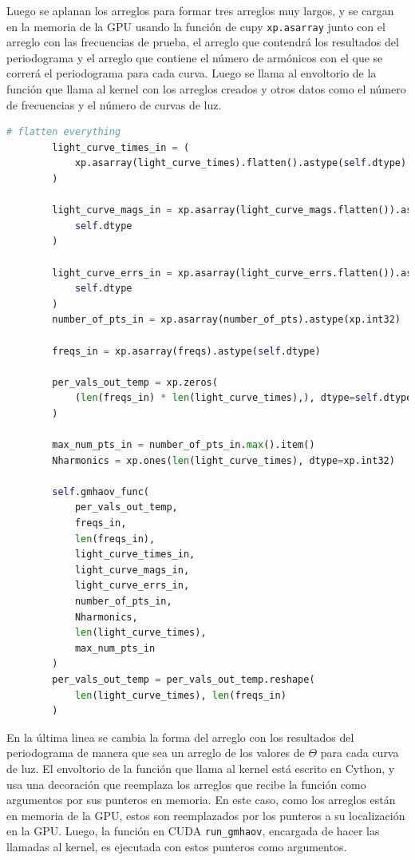 Luego se aplanan los arreglos para formar tres arreglos muy largos, y se cargan en la memoria de la GPU usando la función de cupy \texttt{xp.asarray} junto con el arreglo con las frecuencias de prueba, el arreglo que contendrá los resultados del periodograma y el arreglo que contiene el número de armónicos con el que se correrá el periodograma para cada curva. Luego se llama al envoltorio de la función que llama al kernel con los arreglos creados y otros datos como el número de frecuencias y el número de curvas de luz.
\begin{lstlisting}[language=Python]
        # flatten everything
        light_curve_times_in = (
            xp.asarray(light_curve_times).flatten().astype(self.dtype)
        )

        light_curve_mags_in = xp.asarray(light_curve_mags.flatten()).astype(
            self.dtype
        )

        light_curve_errs_in = xp.asarray(light_curve_errs.flatten()).astype(
            self.dtype
        )
        number_of_pts_in = xp.asarray(number_of_pts).astype(xp.int32)

        freqs_in = xp.asarray(freqs).astype(self.dtype)

        per_vals_out_temp = xp.zeros(
            (len(freqs_in) * len(light_curve_times),), dtype=self.dtype
        )

        max_num_pts_in = number_of_pts_in.max().item()
        Nharmonics = xp.ones(len(light_curve_times), dtype=xp.int32)

        self.gmhaov_func(
            per_vals_out_temp,
            freqs_in,
            len(freqs_in),
            light_curve_times_in,
            light_curve_mags_in,
            light_curve_errs_in,
            number_of_pts_in,
            Nharmonics,
            len(light_curve_times),
            max_num_pts_in
        )
        per_vals_out_temp = per_vals_out_temp.reshape(
            len(light_curve_times), len(freqs_in)
        )
\end{lstlisting}
En la última linea se cambia la forma del arreglo con los resultados del periodograma de manera que sea un arreglo de los valores de $\Theta$ para cada curva de luz.
El envoltorio de la función que llama al kernel está escrito en Cython, y usa una decoración que reemplaza los arreglos que recibe la función como argumentos por sus punteros en memoria. En este caso, como los arreglos están en memoria de la GPU, estos son reemplazados por los punteros a su localización en la GPU. Luego, la función en CUDA \texttt{run\_gmhaov}, encargada de hacer las llamadas al kernel, es ejecutada con estos punteros como argumentos.
